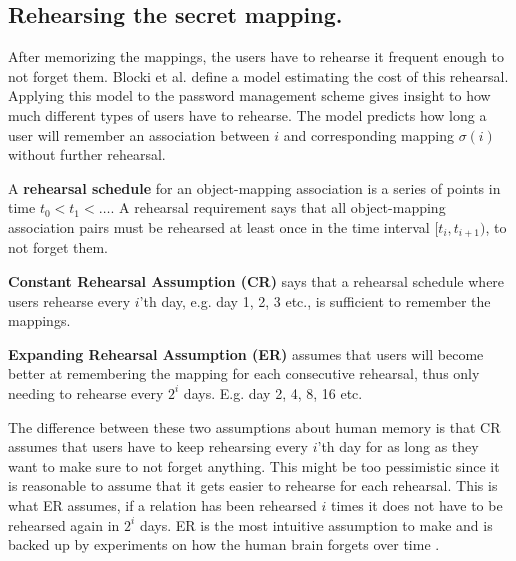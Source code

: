 \subsection{Rehearsing the secret mapping.}
After memorizing the mappings, the users have to rehearse it frequent enough to not forget them. Blocki et al. \cite{naturally-rehearsing} define a model estimating the cost of this rehearsal. Applying this model to the password management scheme gives insight to how much different types of users have to rehearse. The model predicts how long a user will remember an association between $i$ and corresponding mapping $\sigma(i)$ without further rehearsal.  

\begin{definition}
    \label{rehearsal-schedule}
A \textbf{ rehearsal schedule } for an object-mapping association is a series of points in time $t_0 < t_1 < \dots$. A rehearsal requirement says that all object-mapping association pairs must be rehearsed at least once in the time interval $[t_i, t_{i+1})$, to not forget them.
\end{definition}

\begin{requirement}\label{CR}
    \textbf{ Constant Rehearsal Assumption (CR)} says that a rehearsal schedule where users rehearse every $i$'th day, e.g. day 1, 2, 3 etc., is sufficient to remember the mappings.
\end{requirement}

\begin{requirement}\label{ER}
    \textbf{Expanding Rehearsal Assumption (ER)} assumes that users will become better at remembering the mapping for each consecutive rehearsal, thus only needing to rehearse every $2^i$ days. E.g. day 2, 4, 8, 16 etc.
\end{requirement}

The difference between these two assumptions about human memory is that CR assumes that users have to keep rehearsing every $i$'th day for as long as they want to make sure to not forget anything. This might be too pessimistic since it is reasonable to assume that it gets easier to rehearse for each rehearsal. This is what ER assumes, if a relation has been rehearsed $i$ times it does not have to be rehearsed again in $2^{i}$ days. ER is the most intuitive assumption to make and is backed up by experiments on how the human brain forgets over time \cite{forgetting, human-memory}.



